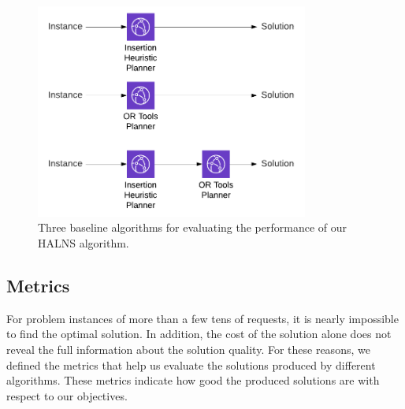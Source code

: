     \begin{figure}[!ht]
        \centering
        \includegraphics[width=0.8\textwidth]{figures/baseline-algorithms.pdf}
        \caption{Three baseline algorithms for evaluating the performance of our HALNS algorithm.}
        \label{fig:baseline-algorithms}
    \end{figure}
    
    \subsection{Metrics} \label{sec:metrics}
    
    For problem instances of more than a few tens of requests, it is nearly impossible to find the optimal solution. In addition, the cost of the solution alone does not reveal the full information about the solution quality. For these reasons, we defined the metrics that help us evaluate the solutions produced by different algorithms. These metrics indicate how good the produced solutions are with respect to our objectives.

